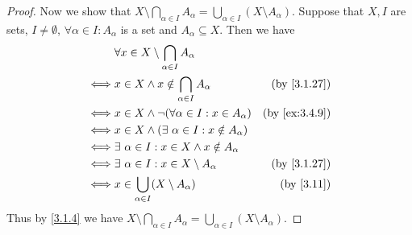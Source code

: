 \begin{proof}
  Now we show that \(X \setminus \bigcap_{\alpha \in I} A_{\alpha} = \bigcup_{\alpha \in I} (X \setminus A_{\alpha})\).
  Suppose that \(X, I\) are sets, \(I \neq \emptyset\), \(\forall \alpha \in I : A_{\alpha}\) is a set and \(A_{\alpha} \subseteq X\).
  Then we have
  \begin{align*}
         & \forall x \in X \setminus \bigcap_{\alpha \in I} A_{\alpha}                                \\
    \iff & x \in X \land x \notin \bigcap_{\alpha \in I} A_{\alpha}     & \text{(by \cref{3.1.27})}   \\
    \iff & x \in X \land \lnot(\forall \alpha \in I : x \in A_{\alpha}) & \text{(by \cref{ex:3.4.9})} \\
    \iff & x \in X \land (\exists\ \alpha \in I : x \notin A_{\alpha})                                \\
    \iff & \exists\ \alpha \in I : x \in X \land x \notin A_{\alpha}                                  \\
    \iff & \exists\ \alpha \in I : x \in X \setminus A_{\alpha}         & \text{(by \cref{3.1.27})}   \\
    \iff & x \in \bigcup_{\alpha \in I} (X \setminus A_{\alpha})        & \text{(by \cref{3.11})}     \\
  \end{align*}
  Thus by \cref{3.1.4} we have \(X \setminus \bigcap_{\alpha \in I} A_{\alpha} = \bigcup_{\alpha \in I} (X \setminus A_{\alpha})\).
\end{proof}